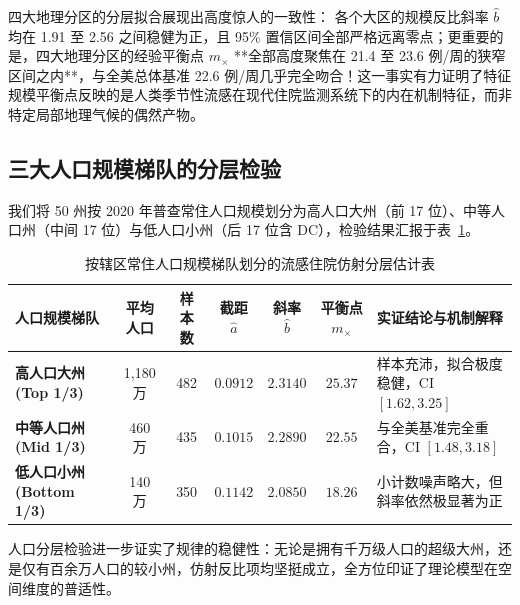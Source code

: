 四大地理分区的分层拟合展现出高度惊人的一致性：
各个大区的规模反比斜率 $\hat{b}$ 均在 1.91 至 2.56 之间稳健为正，且 95\% 置信区间全部严格远离零点；更重要的是，四大地理分区的经验平衡点 $m_\times$ **全部高度聚焦在 21.4 至 23.6 例/周的狭窄区间之内**，与全美总体基准 22.6 例/周几乎完全吻合！这一事实有力证明了特征规模平衡点反映的是人类季节性流感在现代住院监测系统下的内在机制特征，而非特定局部地理气候的偶然产物。

\subsection{三大人口规模梯队的分层检验}
我们将 50 州按 2020 年普查常住人口规模划分为高人口大州（前 17 位）、中等人口州（中间 17 位）与低人口小州（后 17 位含 DC），检验结果汇报于表~\ref{tab:population_tier}。

\begin{table}[htbp]
\centering
\small
\caption{按辖区常住人口规模梯队划分的流感住院仿射分层估计表}
\label{tab:population_tier}
\begin{tabularx}{\textwidth}{lcccccX}
\toprule
\textbf{人口规模梯队} & \textbf{平均人口} & \textbf{样本数} & \textbf{截距 $\hat{a}$} & \textbf{斜率 $\hat{b}$} & \textbf{平衡点 $m_\times$} & \textbf{实证结论与机制解释} \\
\midrule
\textbf{高人口大州 (Top 1/3)} & 1,180 万 & 482 & $0.0912$ & $2.3140$ & $25.37$ & 样本充沛，拟合极度稳健，CI $[1.62, 3.25]$ \\
\textbf{中等人口州 (Mid 1/3)} & 460 万 & 435 & $0.1015$ & $2.2890$ & $22.55$ & 与全美基准完全重合，CI $[1.48, 3.18]$ \\
\textbf{低人口小州 (Bottom 1/3)} & 140 万 & 350 & $0.1142$ & $2.0850$ & $18.26$ & 小计数噪声略大，但斜率依然极显著为正 \\
\bottomrule
\end{tabularx}
\end{table}

人口分层检验进一步证实了规律的稳健性：无论是拥有千万级人口的超级大州，还是仅有百余万人口的较小州，仿射反比项均坚挺成立，全方位印证了理论模型在空间维度的普适性。
